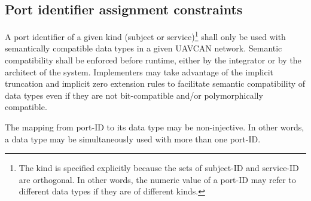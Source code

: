 \subsection{Port identifier assignment constraints}

A port identifier of a given kind (subject or service)\footnote{%
    The kind is specified explicitly because the sets of subject-ID and service-ID are orthogonal.
    In other words, the numeric value of a port-ID may refer to different data types if they are of different kinds.
} shall only be used with semantically compatible data types in a given UAVCAN network.
Semantic compatibility shall be enforced before runtime, either by the integrator or by the architect of the system.
Implementers may take advantage of the implicit truncation and implicit zero extension rules to facilitate
semantic compatibility of data types even if they are not bit-compatible and/or polymorphically compatible.

The mapping from port-ID to its data type may be non-injective.
In other words, a data type may be simultaneously used with more than one port-ID.
